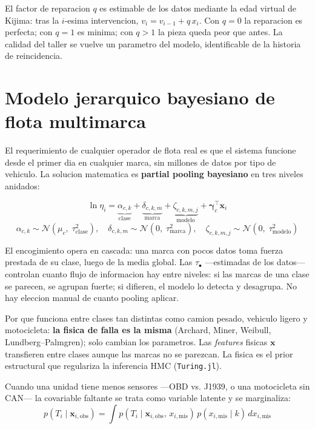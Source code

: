\documentclass[10.5pt,a4paper]{article}
\begin{document}
\medskip
El factor de reparacion $q$ es estimable de los datos mediante la edad virtual de Kijima: tras la $i$-esima intervencion, $v_i = v_{i-1} + q\,x_i$. Con $q=0$ la reparacion es perfecta; con $q=1$ es minima; con $q > 1$ la pieza queda peor que antes. La calidad del taller se vuelve un parametro del modelo, identificable de la historia de reincidencia.

\section{Modelo jerarquico bayesiano de flota multimarca}

El requerimiento de cualquier operador de flota real es que el sistema funcione desde el primer dia en cualquier marca, sin millones de datos por tipo de vehiculo. La solucion matematica es \textbf{partial pooling bayesiano} en tres niveles anidados:

\begin{mathbox}
$$\ln\eta_i = \underbrace{\alpha_{c,k}}_{\text{clase}} + \underbrace{\delta_{c,k,m}}_{\text{marca}} + \underbrace{\zeta_{c,k,m,j}}_{\text{modelo}} + \boldsymbol\gamma_c^\top\mathbf{x}_i$$
$$\alpha_{c,k} \sim \mathcal{N}(\mu_c,\;\tau_{\text{clase}}^2), \quad \delta_{c,k,m} \sim \mathcal{N}(0,\;\tau_{\text{marca}}^2), \quad \zeta_{c,k,m,j} \sim \mathcal{N}(0,\;\tau_{\text{modelo}}^2)$$
\end{mathbox}

El encogimiento opera en cascada: una marca con pocos datos toma fuerza prestada de su clase, luego de la media global. Las $\tau_\bullet$ ---estimadas de los datos--- controlan cuanto flujo de informacion hay entre niveles: si las marcas de una clase se parecen, se agrupan fuerte; si difieren, el modelo lo detecta y desagrupa. No hay eleccion manual de cuanto pooling aplicar.

\medskip
Por que funciona entre clases tan distintas como camion pesado, vehiculo ligero y motocicleta: \textbf{la fisica de falla es la misma} (Archard, Miner, Weibull, Lundberg--Palmgren); solo cambian los parametros. Las \textit{features} fisicas $\mathbf{x}$ transfieren entre clases aunque las marcas no se parezcan. La fisica es el prior estructural que regulariza la inferencia HMC (\texttt{Turing.jl}).

\medskip
Cuando una unidad tiene menos sensores ---OBD vs. J1939, o una motocicleta sin CAN--- la covariable faltante se trata como variable latente y se marginaliza:
$$p(T_i \mid \mathbf{x}_{i,\text{obs}}) = \int p(T_i \mid \mathbf{x}_{i,\text{obs}},\, x_{i,\text{mis}})\,p(x_{i,\text{mis}}\mid k)\,dx_{i,\text{mis}}$$
\end{document}
